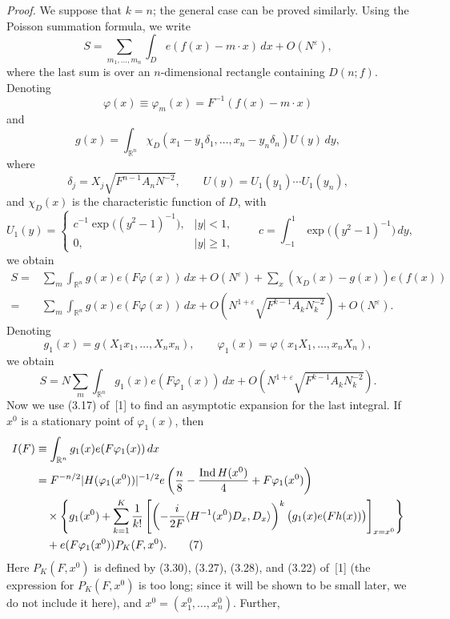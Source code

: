 \documentclass[10pt]{article}
\begin{document}
\medskip
\noindent\textit{Proof.}
We suppose that $k=n$; the general case can be proved similarly. Using the Poisson summation formula, we write
\[
  S=\sum_{m_1,\ldots,m_n}\int_D e(f(x)-m\cdot x)\,dx+O(N^\varepsilon),
\]
where the last sum is over an $n$-dimensional rectangle containing $D(n;f)$. Denoting
\[
  \varphi(x)\equiv\varphi_m(x)=F^{-1}(f(x)-m\cdot x)
\]
and
\[
  g(x)=\int_{\mathbb R^n}
  \chi_D(x_1-y_1\delta_1,\ldots,x_n-y_n\delta_n)U(y)\,dy,
\]
where
\[
  \delta_j=X_j\sqrt{F^{n-1}A_nN^{-2}},
  \qquad U(y)=U_1(y_1)\cdots U_1(y_n),
\]
and $\chi_D(x)$ is the characteristic function of $D$, with
\[
  U_1(y)=
  \begin{cases}
    c^{-1}\exp\bigl((y^2-1)^{-1}\bigr),&|y|<1,\\
    0,&|y|\geqslant1,
  \end{cases}
  \qquad
  c=\int_{-1}^{1}\exp\bigl((y^2-1)^{-1}\bigr)\,dy,
\]
we obtain
\[
\begin{aligned}
S={}&\sum_m\int_{\mathbb R^n}g(x)e(F\varphi(x))\,dx+O(N^\varepsilon)
 +\sum_x(\chi_D(x)-g(x))e(f(x))\\
={}&\sum_m\int_{\mathbb R^n}g(x)e(F\varphi(x))\,dx
 +O\left(N^{1+\varepsilon}\sqrt{F^{k-1}A_kN_k^{-2}}\right)+O(N^\varepsilon).
\end{aligned}
\]
Denoting
\[
  g_1(x)=g(X_1x_1,\ldots,X_nx_n),
  \qquad
  \varphi_1(x)=\varphi(x_1X_1,\ldots,x_nX_n),
\]
we obtain
\begin{equation}
  S=N\sum_m\int_{\mathbb R^n}g_1(x)e(F\varphi_1(x))\,dx
  +O\left(N^{1+\varepsilon}\sqrt{F^{k-1}A_kN_k^{-2}}\right).
  \tag{6}
\end{equation}
Now we use (3.17) of~[1] to find an asymptotic expansion for the last integral. If $x^0$ is a stationary point of $\varphi_1(x)$, then
\begin{align}
I(F)&\equiv\int_{\mathbb R^n}g_1(x)e(F\varphi_1(x))\,dx\notag\\
&=F^{-n/2}|H(\varphi_1(x^0))|^{-1/2}
 e\left(\frac n8-\frac{\operatorname{Ind}H(x^0)}4+F\varphi_1(x^0)\right)\notag\\
&\quad\times\left\{g_1(x^0)+\sum_{k=1}^{K}\frac1{k!}
 \left[\left(-\frac{i}{2F}\langle H^{-1}(x^0)D_x,D_x\rangle\right)^k
 \bigl(g_1(x)e(Fh(x))\bigr)\right]_{x=x^0}\right\}\notag\\
&\quad+e(F\varphi_1(x^0))P_K(F,x^0).
\tag{7}
\end{align}
Here $P_K(F,x^0)$ is defined by (3.30), (3.27), (3.28), and (3.22) of~[1] (the expression for $P_K(F,x^0)$ is too long; since it will be shown to be small later, we do not include it here), and $x^0=(x_1^0,\ldots,x_n^0)$. Further,
\end{document}
